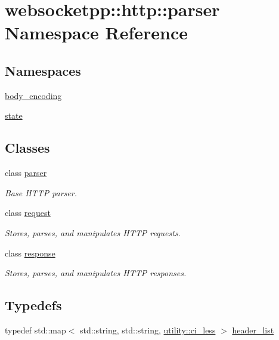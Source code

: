 \hypertarget{namespacewebsocketpp_1_1http_1_1parser}{}\section{websocketpp\+:\+:http\+:\+:parser Namespace Reference}
\label{namespacewebsocketpp_1_1http_1_1parser}
\subsection*{Namespaces}
\begin{DoxyCompactItemize}
\item 
 \hyperlink{namespacewebsocketpp_1_1http_1_1parser_1_1body__encoding}{body\+\_\+encoding}
\item 
 \hyperlink{namespacewebsocketpp_1_1http_1_1parser_1_1state}{state}
\end{DoxyCompactItemize}
\subsection*{Classes}
\begin{DoxyCompactItemize}
\item 
class \hyperlink{classwebsocketpp_1_1http_1_1parser_1_1parser}{parser}
\begin{DoxyCompactList}\small\item\em Base H\+T\+T\+P parser. \end{DoxyCompactList}\item 
class \hyperlink{classwebsocketpp_1_1http_1_1parser_1_1request}{request}
\begin{DoxyCompactList}\small\item\em Stores, parses, and manipulates H\+T\+T\+P requests. \end{DoxyCompactList}\item 
class \hyperlink{classwebsocketpp_1_1http_1_1parser_1_1response}{response}
\begin{DoxyCompactList}\small\item\em Stores, parses, and manipulates H\+T\+T\+P responses. \end{DoxyCompactList}\end{DoxyCompactItemize}
\subsection*{Typedefs}
\begin{DoxyCompactItemize}
\item 
typedef std\+::map$<$ std\+::string, std\+::string, \hyperlink{structwebsocketpp_1_1utility_1_1ci__less}{utility\+::ci\+\_\+less} $>$ \hyperlink{namespacewebsocketpp_1_1http_1_1parser_a4bb5b2821dab6a182bfe4c5415229e6e}{header\+\_\+list}
\end{DoxyCompactItemize}
